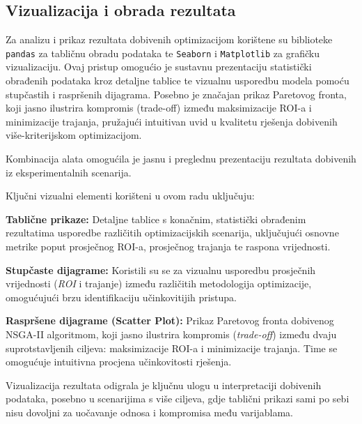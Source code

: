 \subsection{Vizualizacija i obrada rezultata}

Za analizu i prikaz rezultata dobivenih optimizacijom korištene su biblioteke \texttt{pandas} za tabličnu obradu podataka te \texttt{Seaborn} i \texttt{Matplotlib} \cite{Waskom2021, Hunter2007} za grafičku vizualizaciju.
Ovaj pristup omogućio je sustavnu prezentaciju statistički obrađenih podataka kroz detaljne tablice te vizualnu usporedbu modela pomoću stupčastih i raspršenih dijagrama. Posebno je značajan prikaz Paretovog fronta, koji jasno ilustrira kompromis (trade-off) između maksimizacije ROI-a i minimizacije trajanja, pružajući intuitivan uvid u kvalitetu rješenja dobivenih više-kriterijskom optimizacijom.

Kombinacija alata omogućila je jasnu i preglednu prezentaciju rezultata 
dobivenih iz eksperimentalnih scenarija.

Ključni vizualni elementi korišteni u ovom radu uključuju:

    \textbf{Tablične prikaze:} Detaljne tablice s konačnim, statistički obrađenim rezultatima 
    usporedbe različitih optimizacijskih scenarija, uključujući osnovne metrike 
    poput prosječnog ROI-a, prosječnog trajanja te raspona vrijednosti.

    \textbf{Stupčaste dijagrame:} Koristili su se za vizualnu usporedbu prosječnih vrijednosti 
    (\textit{ROI} i trajanje) između različitih metodologija optimizacije, omogućujući brzu identifikaciju 
    učinkovitijih pristupa.

    \textbf{Raspršene dijagrame (Scatter Plot):} Prikaz Paretovog fronta dobivenog NSGA-II algoritmom, 
    koji jasno ilustrira kompromis (\textit{trade-off}) između dvaju suprotstavljenih ciljeva:
    maksimizacije ROI-a i minimizacije trajanja. Time se omogućuje intuitivna procjena 
    učinkovitosti rješenja.

Vizualizacija rezultata odigrala je ključnu ulogu u interpretaciji dobivenih podataka, 
posebno u scenarijima s više ciljeva, gdje tablični prikazi sami po sebi nisu dovoljni 
za uočavanje odnosa i kompromisa među varijablama.

